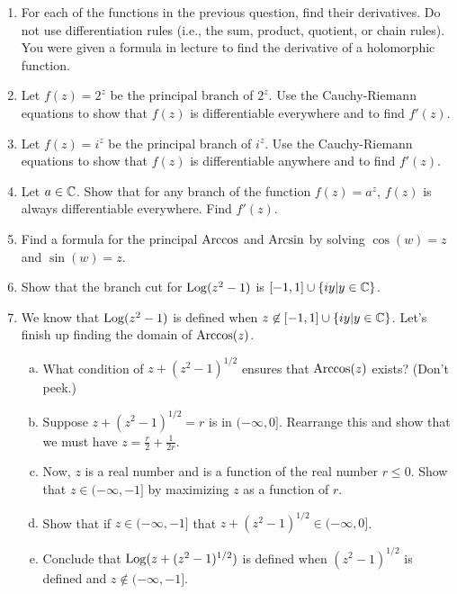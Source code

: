 \begin{enumerate}
\item For each of the functions in the previous question, find their derivatives. Do not use differentiation rules (i.e., the sum, product, quotient, or chain rules). You were given a formula in lecture to find the derivative of a holomorphic function.

\item Let $f(z) = 2^z$ be the principal branch of $2^z$. Use the Cauchy-Riemann equations to show that $f(z)$ is differentiable everywhere and to find $f'(z)$.

\item Let $f(z) = i^z$ be the principal branch of $i^z$. Use the Cauchy-Riemann equations to show that $f(z)$ is differentiable anywhere and to find $f'(z)$.

\item Let $a\in\mathbb{C}$. Show that for any branch of the function $f(z) = a^z$, $f(z)$ is always differentiable everywhere. Find $f'(z)$.

\item Find a formula for the principal $\mathrm{Arccos}$ and $\mathrm{Arcsin}$ by solving $\cos(w)=z$ and $\sin(w) = z$.

\item Show that the branch cut for $\mathrm{Log}(z^2 - 1)$ is $[-1,1] \cup \{iy|y\in\mathbb{C}\}$.

\item We know that $\mathrm{Log}(z^2 - 1)$ is defined when $z\not\in [-1,1] \cup \{iy|y\in \mathbb{C}\}$. Let's finish up finding the domain of $\mathrm{Arccos}(z)$.

\begin{enumerate}[a)]
\item What condition of $z + (z^2 - 1)^{1/2}$ ensures that $\mathrm{Arccos}(z)$ exists? (Don't peek.)
\item Suppose $z + (z^2 - 1)^{1/2} = r$ is in $(-\infty,0]$. Rearrange this and show that we must have $z = \frac{r}{2} + \frac{1}{2r}$.

\item Now, $z$ is a real number and is a function of the real number $r \le 0$. Show that $z \in (-\infty,-1]$ by maximizing $z$ as a function of $r$.

\item Show that if $z \in (-\infty,-1]$ that $z + (z^2 - 1)^{1/2} \in (-\infty,0]$.

\item Conclude that $\mathrm{Log}(z + (z^2 - 1)^{1/2})$ is defined when $(z^2 - 1)^{1/2}$ is defined and $z \not\in (-\infty,-1]$.


\end{enumerate}
\end{enumerate}
